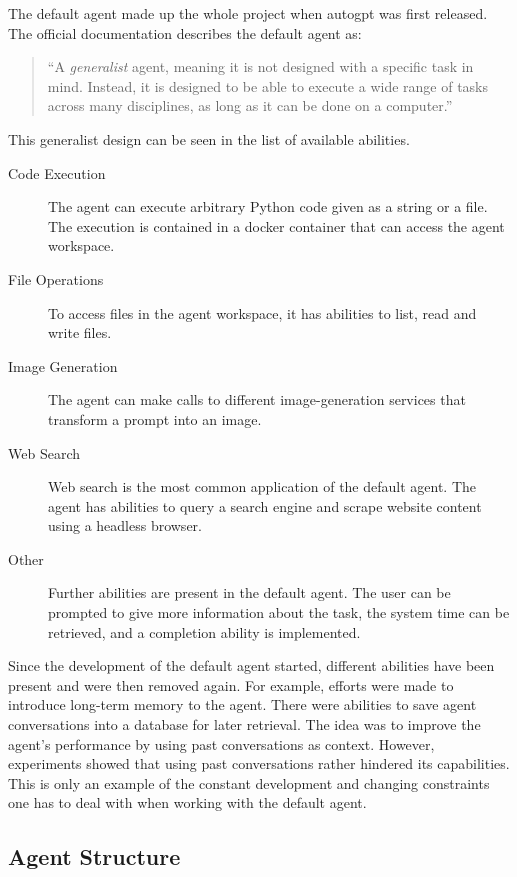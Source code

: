 \documentclass[../main.tex]{subfiles}
\begin{document}
The default agent made up the whole project when \gls{autogpt} was first released.
The official documentation \autocite{zotero-189} describes the default agent as:
\begin{quote}
    ``A \emph{generalist} agent, meaning it is not designed with a specific task in mind.
    Instead, it is designed to be able to execute a wide range of tasks across many disciplines,
    as long as it can be done on a computer.''
\end{quote}
This generalist design can be seen in the list of available abilities.
\begin{description}
    \item[Code Execution] The agent can execute arbitrary Python code given as a
        string or a file.
        The execution is contained in a docker container
        that can access the agent workspace.
    \item[File Operations] To access files in the agent workspace,
        it has abilities to list, read and write files.
    \item[Image Generation]
        The agent can make calls to different image-generation services
        that transform a prompt into an image.
    \item[Web Search]
        Web search is the most common application of the default agent.
        The agent has abilities to query a search engine
        and scrape website content using a headless browser.
    \item[Other]
        Further abilities are present in the default agent.
        The user can be prompted to give more information about the task,
        the system time can be retrieved, and a completion ability is implemented.
\end{description}
Since the development of the default agent started,
different abilities have been present and were then removed again.
For example, efforts were made to introduce long-term memory to the agent.
There were abilities to save agent conversations into a database for later retrieval.
The idea was to improve the agent's performance by using past conversations as context.
However, experiments showed that using past conversations rather hindered its capabilities. %
This is only an example of the constant development and changing constraints
one has to deal with when working with the default agent.

\subsection{Agent Structure}
\end{document}

